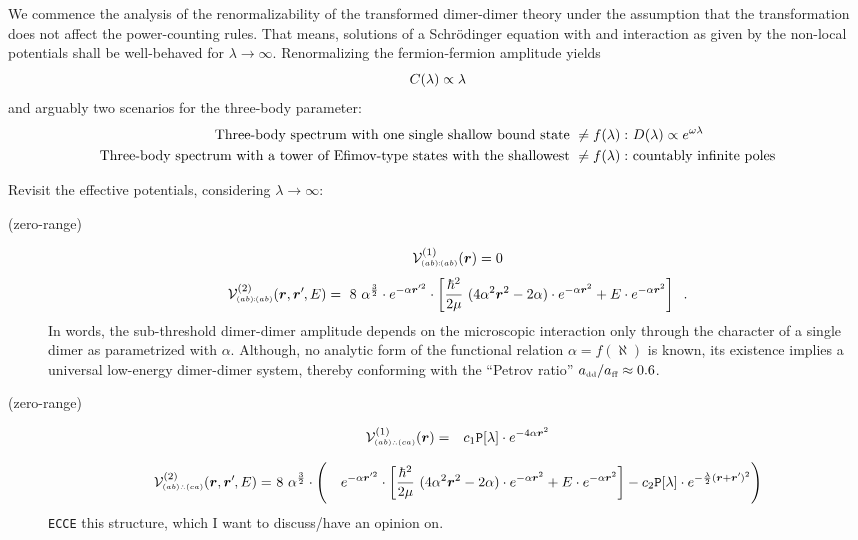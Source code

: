\documentclass[onecolumn,preprint,superscriptaddress,nofootinbib,notitlepage,10pt,linenumbers]{revtex4-1}
\newcommand*{\mprime}{^{\prime}\mkern-1.2mu}
\newcommand{\la}{\label}
\newcommand{\be}{\begin{equation}}
\newcommand{\ee}{\end{equation}}
\newcommand{\ve}[1]{\ensuremath{\boldsymbol{#1}}}
\newcommand{\cc}{\ensuremath C(\lambda)}
\newcommand{\dd}{\ensuremath D(\lambda)}
\newcommand{\abab}{\ensuremath $(ab)\!\!:\!\!(ab)$}
\newcommand{\abca}{\ensuremath $(ab)\wasytherefore(ca)$}
\newcommand{\aff}{\ensuremath a_{\text{\tiny ff}}}
\newcommand{\add}{\ensuremath a_{\text{\tiny dd}}}
\begin{document}
We commence the analysis of the renormalizability of the transformed dimer-dimer theory under the assumption that
the transformation does not affect the power-counting rules. That means, solutions of a Schr\"odinger equation
with and interaction as given by the non-local potentials shall be well-behaved for $\lambda\to\infty$.
Renormalizing the fermion-fermion amplitude yields
\be\la{eq.c0running}
\cc\propto\lambda
\ee
and arguably two scenarios for the three-body parameter:
\begin{align}
\text{Three-body spectrum with one single shallow bound state}~\neq f(\lambda):~&\dd\propto e^{\omega\lambda}\\
\text{Three-body spectrum with a tower of Efimov-type states with the shallowest}~\neq f(\lambda):~&\text{countably infinite poles}
\end{align}

Revisit the effective potentials, considering $\lambda\to\infty$:
\begin{description}
	\item[(zero-range)~\abab]
\be
\mathcal{V}^{(1)}_{\text{\tiny\abab}}(\ve{r})=0
\ee
\be
\mathcal{V}^{(2)}_{\text{\tiny\abab}}(\ve{r},\ve{r}\mprime,E)=
~8~\alpha^{\frac{3}{2}}\cdot e^{-\alpha\ve{r}\mprime^2}\cdot
\left[\frac{\hbar^2}{2\mu}~(4\alpha^2\ve{r}^2-2\alpha)
\cdot e^{-\alpha\ve{r}^2}+
E\cdot e^{-\alpha\ve{r}^2}\right]\;\;.
\ee
In words, the sub-threshold dimer-dimer amplitude depends on the microscopic interaction only through the
character of a single dimer as parametrized with $\alpha$. Although, no analytic form of the functional relation
$\alpha=f(\aleph)$ is known, its existence implies a universal low-energy dimer-dimer system, thereby conforming with
the ``Petrov ratio'' $\add/\aff\approx0.6$. 
\item[(zero-range)~\abca]
\begin{eqnarray}
\mathcal{V}^{(1)}_{\text{\tiny\abca}}(\ve{r})&=&
c_1\texttt{P}[\lambda]\cdot
 e^{-4\alpha\ve{r}^2}
\end{eqnarray}


\begin{eqnarray}
\mathcal{V}^{(2)}_{\text{\tiny\abca}}(\ve{r},\ve{r}\mprime,E)=&~8~\alpha^{\frac{3}{2}}\cdot\Bigg(&e^{-\alpha\ve{r}\mprime^2}\cdot
\left[\frac{\hbar^2}{2\mu}~(4\alpha^2\ve{r}^2-2\alpha)
\cdot e^{-\alpha\ve{r}^2}+
E\cdot e^{-\alpha\ve{r}^2}\right]-c_2\texttt{P}[\lambda]\cdot
 e^{-\frac{\lambda}{2}(\ve{r}+\ve{r}\mprime)^2}\Bigg)
\end{eqnarray}
\texttt{ECCE} this structure, which I want to discuss/have an opinion on.
\end{description}
\end{document}
